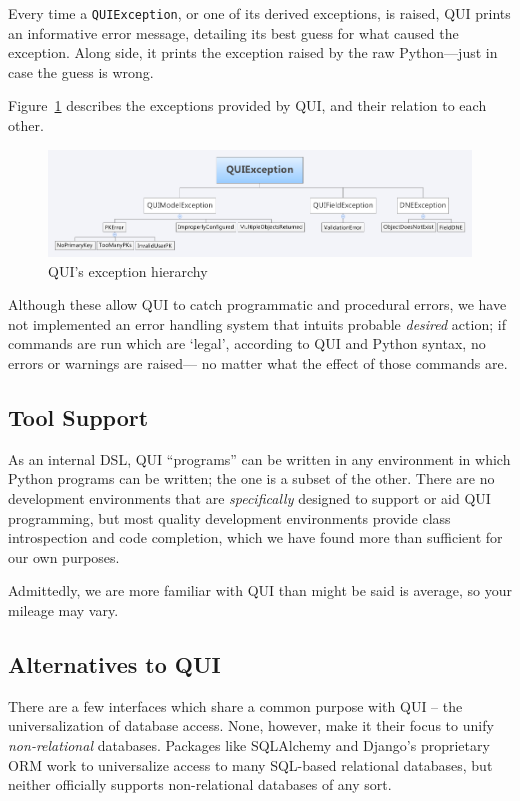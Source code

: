 \documentclass{article} %
\newcommand{\il}[1]{\mbox{\lstinline{#1}}}
\begin{document}
Every time a \il{QUIException}, or one of its derived exceptions, is raised, QUI prints an informative error message, detailing its best
guess for what caused the exception. Along side, it prints the exception raised by the raw Python---just in case the guess is wrong.

Figure~\ref{fig:exceptionhier} describes the exceptions provided by QUI, and their relation to each other.
\begin{figure}[htb]
\centering
\includegraphics[width=450px]{ExceptionHierarchy}
\caption{QUI's exception hierarchy}
\label{fig:exceptionhier}
\end{figure}

Although these allow QUI to catch programmatic and procedural errors, we have not implemented an error handling system that intuits
probable \emph{desired} action; if commands are run which are `legal', according to QUI and Python syntax, no errors or warnings are raised---
no matter what the effect of those commands are.

\subsection{Tool Support}
As an internal DSL, QUI ``programs'' can be written in any environment in which Python programs can be written; the one is a subset of the 
other. There are no development environments that are \emph{specifically} designed to support or aid QUI programming, but most quality
development environments provide class introspection and code completion, which we have found more than sufficient for our own
purposes. 

Admittedly, we are more familiar with QUI than might be said is average, so your mileage may vary.

\subsection{Alternatives to QUI}
There are a few interfaces which share a common purpose with QUI -- the universalization of database access. None, however,
make it their focus to unify \emph{non-relational} databases. Packages like SQLAlchemy and Django's proprietary ORM work to
universalize access to many SQL-based relational databases, but neither officially supports non-relational databases of any sort.\\
\end{document}
